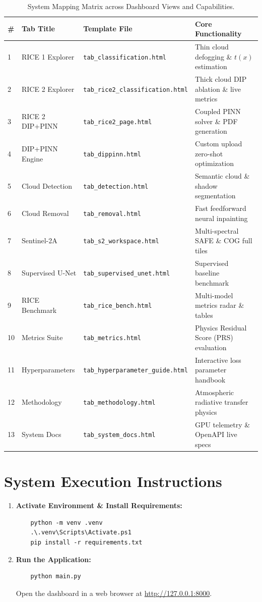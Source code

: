 \documentclass[11pt,a4paper]{article}
\begin{document}
\begin{table}[h!]
\centering
\small
\renewcommand{\arraystretch}{1.15}
\begin{tabularx}{\textwidth}{@{}lllX@{}}
\toprule
\textbf{\#} & \textbf{Tab Title} & \textbf{Template File} & \textbf{Core Functionality} \\
\midrule
1 & RICE 1 Explorer & \texttt{tab\_classification.html} & Thin cloud defogging \& $t(x)$ estimation \\
2 & RICE 2 Explorer & \texttt{tab\_rice2\_classification.html} & Thick cloud DIP ablation \& live metrics \\
3 & RICE 2 DIP+PINN & \texttt{tab\_rice2\_page.html} & Coupled PINN solver \& PDF generation \\
4 & DIP+PINN Engine & \texttt{tab\_dippinn.html} & Custom upload zero-shot optimization \\
5 & Cloud Detection & \texttt{tab\_detection.html} & Semantic cloud \& shadow segmentation \\
6 & Cloud Removal & \texttt{tab\_removal.html} & Fast feedforward neural inpainting \\
7 & Sentinel-2A & \texttt{tab\_s2\_workspace.html} & Multi-spectral SAFE \& COG full tiles \\
8 & Supervised U-Net & \texttt{tab\_supervised\_unet.html} & Supervised baseline benchmark \\
9 & RICE Benchmark & \texttt{tab\_rice\_bench.html} & Multi-model metrics radar \& tables \\
10 & Metrics Suite & \texttt{tab\_metrics.html} & Physics Residual Score (PRS) evaluation \\
11 & Hyperparameters & \texttt{tab\_hyperparameter\_guide.html} & Interactive loss parameter handbook \\
12 & Methodology & \texttt{tab\_methodology.html} & Atmospheric radiative transfer physics \\
13 & System Docs & \texttt{tab\_system\_docs.html} & GPU telemetry \& OpenAPI live specs \\
\bottomrule
\end{tabularx}
\caption{System Mapping Matrix across Dashboard Views and Capabilities.}
\end{table}

\section{System Execution Instructions}

\begin{enumerate}
    \item \textbf{Activate Environment \& Install Requirements:}
    \begin{verbatim}
    python -m venv .venv
    .\.venv\Scripts\Activate.ps1
    pip install -r requirements.txt
    \end{verbatim}
    \item \textbf{Run the Application:}
    \begin{verbatim}
    python main.py
    \end{verbatim}
    Open the dashboard in a web browser at \url{http://127.0.0.1:8000}.
\end{enumerate}
\end{document}
